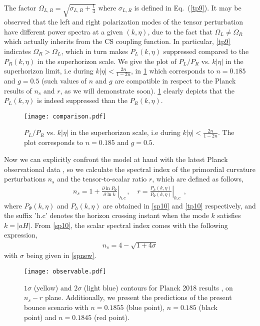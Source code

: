 \documentclass{article}
\begin{document}
The factor $\Omega_{L,R} = \sqrt{\sigma_{L,R} + \frac{1}{4}}$ where $\sigma_{L,R}$ is defined in Eq.~(\ref{tp9}). It may be 
observed that the left and right polarization modes of the tensor perturbation have different power spectra at a given 
$(k,\eta)$, due to the fact that $\Omega_L \neq \Omega_R$ which actually inherits from the CS coupling function. In particular, 
\ref{tp9} indicates $\Omega_R > \Omega_L$, which in turn makes $P_L(k,\eta)$ suppressed compared to the $P_R(k,\eta)$ in the 
superhorizon scale. We give the plot of $P_L/P_R$ vs. $k\left|\eta\right|$ in the superhorizon limit, i.e during $k\left|\eta\right| < \frac{2n}{1-2n}$, 
in \ref{plot-mode-comparison} which corresponds to $n = 0.185$ and $g = 0.5$ (such values of $n$ and $g$ are compatible in respect to the 
Planck results of $n_s$ and $r$, as we will demonstrate soon). \ref{plot-mode-comparison} clearly depicts that the $P_L(k,\eta)$ is indeed 
suppressed than the $P_R(k,\eta)$. 

\begin{figure}[!h]
\begin{center}
 \centering
 \texttt{[image: comparison.pdf]}
 \caption{$P_L/P_R$ vs. $k\left|\eta\right|$ in the superhorizon scale, i.e during $k\left|\eta\right| < \frac{2n}{1-2n}$. 
 The plot corresponds to $n = 0.185$ and $g = 0.5$.}
 \label{plot-mode-comparison}
\end{center}
\end{figure}


Now we can explicitly confront the model at hand with the latest Planck observational data \cite{Akrami:2018odb}, so we 
calculate the spectral index of the primordial curvature perturbations $n_s$ and the tensor-to-scalar ratio $r$, which are defined as follows,
\begin{align}
n_s = 1 + \left. \frac{\partial \ln{P_{\Psi}}}{\partial
\ln{k}}\right|_{h.c} \, , \quad
r = \left. \frac{P_{h}(k,\eta)}{P_{\Psi}(k,\eta)}\right|_{h.c}~~,
\label{obs1}
\end{align}
where $P_{\Psi}(k,\eta)$ and $P_h(k,\eta)$ are obtained in \ref{sp10} and \ref{tp10} respectively, and the suffix 'h.c' denotes the horizon crossing 
instant when the mode $k$ satisfies $k = \left|aH\right|$. From \ref{sp10}, the scalar spectral 
index comes with the following expression,
\begin{align}
n_s = 4 - \sqrt{1 + 4\sigma}
\label{obs2}
\end{align}
with $\sigma$ being given in \ref{spnew}.

\begin{figure}
\begin{center}
 \centering
 \texttt{[image: observable.pdf]}
 \caption{$1\sigma$ (yellow) and $2\sigma$ (light blue) contours for Planck 
 2018 results \cite{Akrami:2018odb}, on $n_s-r$ plane. 
 Additionally, we present the predictions of the present bounce scenario with 
 $n = 0.1855$ (blue point), $n = 0.185$ (black point) and $n = 0.1845$ (red point).}
 \label{plot-observable}
\end{center}
\end{figure}
\end{document}
